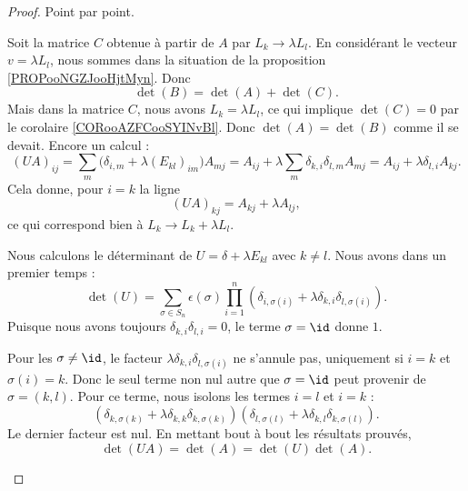 \begin{proof}
	Point par point.
	\begin{subproof}
		\spitem[\ref{ITEMooJSRDooTggEyO}]
		Soit la matrice \( C\) obtenue à partir de \( A\) par \( L_k\to \lambda L_l\). En considérant le vecteur \( v=\lambda L_l\), nous sommes dans la situation de la proposition \ref{PROPooNGZJooHjtMyn}. Donc
		\begin{equation}
			\det(B)=\det(A)+\det(C).
		\end{equation}
		Mais dans la matrice \( C\), nous avons \( L_k=\lambda L_l\), ce qui implique \( \det(C)=0\) par le corolaire \ref{CORooAZFCooSYINvBl}. Donc \( \det(A)=\det(B)\) comme il se devait.
		\spitem[\ref{ITEMooHKZWooVZDgnf}]
		Encore un calcul :
		\begin{equation}
			(UA)_{ij}=\sum_m\big( \delta_{i,m}+\lambda(E_{kl})_{im} \big)A_{mj}=A_{ij}+\lambda\sum_m\delta_{k,i}\delta_{l,m}A_{mj}=A_{ij}+\lambda \delta_{l,i}A_{kj}.
		\end{equation}
		Cela donne, pour \( i=k\) la ligne
		\begin{equation}
			(UA)_{kj}=A_{kj}+\lambda A_{lj},
		\end{equation}
		ce qui correspond bien à \( L_k\to L_k+\lambda L_l\).

		\spitem[\ref{ITEMooPGYJooWTTghT}]
		Nous calculons le déterminant de \( U=\delta+\lambda E_{kl}\) avec \( k\neq l\). Nous avons dans un premier temps :
		\begin{equation}
			\det(U)=\sum_{\sigma\in S_n}\epsilon(\sigma)\prod_{i=1}^n(\delta_{i,\sigma(i)}+\lambda \delta_{k,i}\delta_{l,\sigma(i)}).
		\end{equation}
		Puisque nous avons toujours \( \delta_{k,i}\delta_{l,i}=0\), le terme \( \sigma=\id\) donne \( 1\).

		Pour les \( \sigma\neq \id\), le facteur \( \lambda\delta_{k,i}\delta_{l,\sigma(i)}\) ne s'annule pas, uniquement si \( i=k\) et \( \sigma(i)=k\). Donc le seul terme non nul autre que \( \sigma=\id\) peut provenir de \( \sigma=(k,l)\). Pour ce terme, nous isolons les termes \( i=l\) et \( i=k\) :
		\begin{equation}
			(\delta_{k,\sigma(k)}+\lambda\delta_{k,k}\delta_{k,\sigma(k)})(\delta_{l,\sigma(l)}+\lambda\delta_{k,l}\delta_{k,\sigma(l)}).
		\end{equation}
		Le dernier facteur est nul.
		\spitem[\ref{ITEMooBBEAooZJVGNV}]
		En mettant bout à bout les résultats prouvés,
		\begin{equation}
			\det(UA)=\det(A)=\det(U)\det(A).
		\end{equation}
	\end{subproof}
\end{proof}

